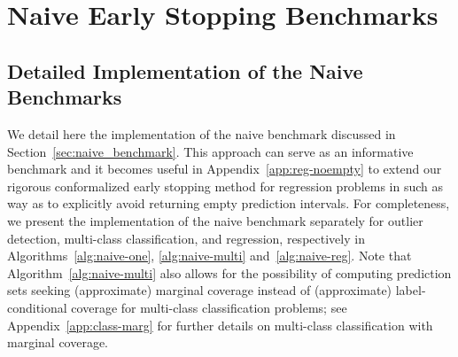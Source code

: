 \appendix
\renewcommand{\thesection}{A\arabic{section}}
\renewcommand{\theequation}{A\arabic{equation}}
\renewcommand{\thetheorem}{A\arabic{theorem}}
\renewcommand{\thecorollary}{A\arabic{corollary}}
\renewcommand{\theproposition}{A\arabic{proposition}}
\renewcommand{\thelemma}{A\arabic{lemma}}
\renewcommand{\thetable}{A\arabic{table}}
\renewcommand{\thefigure}{A\arabic{figure}}
\renewcommand{\thealgorithm}{A\arabic{algorithm}}





\section{Naive Early Stopping Benchmarks} \label{app:naive-benchmarks}

\subsection{Detailed Implementation of the Naive Benchmarks}  \label{app:naive-benchmarks-details}

We detail here the implementation of the naive benchmark discussed in Section~\ref{sec:naive_benchmark}. This approach can serve as an informative benchmark and it becomes useful in Appendix~\ref{app:reg-noempty} to extend our rigorous conformalized early stopping method for regression problems in such as way as to explicitly avoid returning empty prediction intervals.
For completeness, we present the implementation of the naive benchmark separately for outlier detection, multi-class classification, and regression, respectively in Algorithms~\ref{alg:naive-one}, \ref{alg:naive-multi} and~\ref{alg:naive-reg}.
Note that Algorithm~\ref{alg:naive-multi} also allows for the possibility of computing prediction sets seeking (approximate) marginal coverage instead of (approximate) label-conditional coverage for multi-class classification problems; see Appendix~\ref{app:class-marg} for further details on multi-class classification with marginal coverage.

